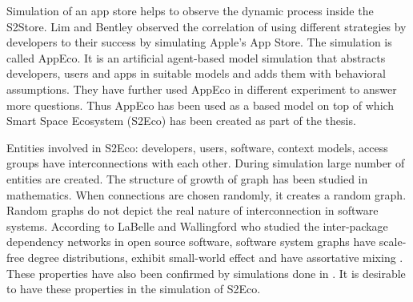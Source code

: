 Simulation of an app store helps to observe the dynamic process inside the S2Store. Lim and Bentley \cite{lim2012successful} observed the correlation of using different strategies by developers to their success by simulating Apple's App Store. The simulation is called AppEco. It is an artificial agent-based model simulation that abstracts developers, users and apps in suitable models and adds them with behavioral assumptions. They have further used AppEco in different experiment to answer more questions. Thus AppEco has been used as a based model on top of which Smart Space Ecosystem (S2Eco) has been created as part of the thesis.

Entities involved in S2Eco: developers, users, software, context models, access groups have interconnections with each other. During simulation large number of entities are created. The structure of growth of graph has been studied in mathematics. When connections are chosen randomly, it creates a random graph. Random graphs do not depict the real nature of interconnection in software systems. According to LaBelle and Wallingford \cite{labelle2004inter} who studied the inter-package dependency networks in open source software, software system graphs have scale-free degree distributions, exhibit small-world effect and have assortative mixing \cite{newman2002assortative}. These properties have also been confirmed by simulations done in \cite{myers2003software}. It is desirable to have these properties in the simulation of S2Eco.
